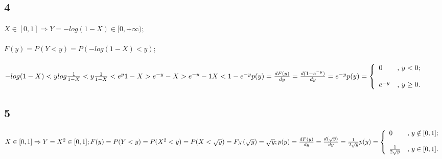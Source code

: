 \documentclass[a4paper]{article}
\begin{document}
\begin{large}
		\subsection*{4}
		$X \in [0,1] \Rightarrow Y=-log(1-X) \in [0,+\infty)$;\\\\
		$F(y)=P(Y<y)=P(-log(1-X)<y)$;\\\\
		$
		-log(1-X)<y\\\\
		log\frac{1}{1-X}<y\\\\
		\frac{1}{1-X}<e^y\\\\
		1-X>e^{-y}\\\\
		-X>e^{-y}-1\\\\
		X<1-e^{-y}\\\\
		p(y)=\frac{dF(y)}{dy}=\frac{d(1-e^{-y})}{dy}=e^{-y}\\\\\\
		p(y) = \left\{ \begin{array}{ll}
			0 & \mbox{, $y<0$};\\
			\\
			e^{-y} & \mbox{, $y \ge 0$}.\end{array} \right.
		$
		\subsection*{5}
		$
		X \in [0,1] \Rightarrow Y=X^2 \in [0,1];\\\\
		F(y)=P(Y<y)=P(X^2<y)=P(X<\sqrt{y})=F_X(\sqrt{y})=\sqrt{y};\\\\
		p(y)=\frac{dF(y)}{dy}=\frac{d(\sqrt{y})}{dy}=\frac{1}{2\sqrt{y}}\\\\\\
		p(y) = \left\{ \begin{array}{ll}
			0 & \mbox{, $y \notin [0,1]$};\\
			\\
			\frac{1}{2\sqrt{y}} & \mbox{, $y \in [0,1]$}.\end{array} \right.
		$

\end{large}
\end{document}
